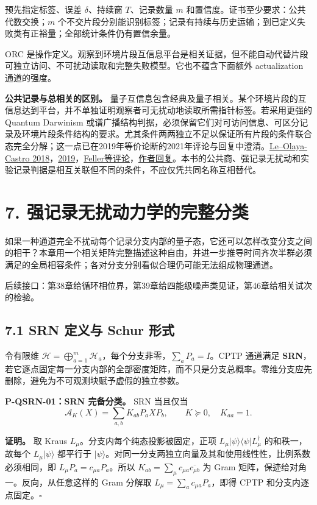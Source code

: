 \documentclass[
  11pt,
  oneside]{book}
\begin{document}
预先指定标签、误差 \(\delta\)、持续窗 \(T\)、记录数量 \(m\)
和置信度。证书至少要求：公共代数交换；\(m\)
个不交片段分别能识别标签；记录有持续与历史运输；到已定义失败类有正裕量；全部统计条件仍有置信余量。

ORC
是操作定义。观察到环境片段互信息平台是相关证据，但不能自动代替片段可独立访问、不可扰动读取和完整失败模型。它也不蕴含下面额外
actualization 通道的强度。

\textbf{公共记录与总相关的区别。}
量子互信息包含经典及量子相关。某个环境片段的互信息达到平台，并不单独证明观察者可无扰动地读取所需指针标签。若采用更强的
Quantum Darwinism
或谱广播结构判据，必须保留它们对可访问信息、可区分记录及环境片段条件结构的要求。尤其条件两两独立不足以保证所有片段的条件联合态完全分解；这一点已在2019年等价论断的2021年评论与回复中澄清。\href{https://doi.org/10.1103/PhysRevA.98.032103}{Le--Olaya-Castro
2018}，\href{https://doi.org/10.1103/PhysRevLett.122.010403}{2019}，\href{https://doi.org/10.1103/PhysRevLett.126.188901}{Feller等评论}，\href{https://doi.org/10.1103/PhysRevLett.126.188902}{作者回复}。本书的公共商、强记录无扰动和实验记录判据是相互关联但不同的条件，不应仅凭共同名称互相替代。

\chapter{7. 强记录无扰动力学的完整分类}\label{ch-7}\hypertarget{ch-7}{}

如果一种通道完全不扰动每个记录分支内部的量子态，它还可以怎样改变分支之间的相干？本章用一个相关矩阵完整描述这种自由，并进一步推导时间齐次半群必须满足的全局相容条件；各对分支分别看似合理仍可能无法组成物理通道。

后续接口：第38章给循环相位界，第39章给四能级噪声类见证，第46章给相关试次的检验。

\section{7.1 SRN 定义与 Schur 形式}

令有限维
\(\mathcal H=\bigoplus_{a=1}^m\mathcal H_a\)，每个分支非零，\(\sum_aP_a=I\)。CPTP
通道满足
\textbf{SRN}，若它逐点固定每一分支内部的全部密度矩阵，而不只是分支总概率。零维分支应先删除，避免为不可观测块赋予虚假的独立参数。

\protect\hypertarget{p-qsrn-01}{}{}

\textbf{P-QSRN-01：SRN 完备分类。} SRN 当且仅当 \[
\mathcal A_K(X)=\sum_{a,b}K_{ab}P_aXP_b,\qquad
K\succeq0,\quad K_{aa}=1.
\]

\textbf{证明。} 取 Kraus \(L_\mu\)。分支内每个纯态投影被固定，正项
\(L_\mu|\psi\rangle\langle\psi|L_\mu^\dagger\) 的和秩一，故每个
\(L_\mu|\psi\rangle\) 都平行于
\(|\psi\rangle\)。对同一分支两独立向量及其和使用线性性，比例系数必须相同，即
\(L_\mu P_a=c_{\mu a}P_a\)。所以
\(K_{ab}=\sum_\mu c_{\mu a}\overline{c_{\mu b}}\) 为 Gram
矩阵，保迹给对角一。反向，从任意这样的 Gram 分解取
\(L_\mu=\sum_ac_{\mu a}P_a\)，即得 CPTP 和分支内逐点固定。\(\square\)
\end{document}
